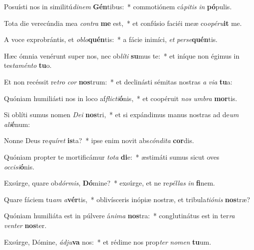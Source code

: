 \item Posuísti nos in similitú\textit{di}\textit{nem} \textbf{Gén}tibus:~* commotiónem cá\textit{pi}\textit{tis} \textit{in} \textbf{pó}pulis.
\item Tota die verecúndia mea \textit{con}\textit{tra} \textbf{me} est,~* et confúsio faciéi meæ co\textit{o}\textit{pé}\textit{ru}\textbf{it} me.
\item A voce exprobrántis, et \textit{ob}\textit{lo}\textbf{quén}tis:~* a fácie inimíci, \textit{et} \textit{per}\textit{se}\textbf{quén}tis.
\item Hæc ómnia venérunt super nos, nec ob\textit{lí}\textit{ti} \textbf{su}mus te:~* et iníque non égimus in tes\textit{ta}\textit{mén}\textit{to} \textbf{tu}o.
\item Et non recéssit re\textit{tro} \textit{cor} \textbf{nos}trum:~* et declinásti sémitas nostras \textit{a} \textit{vi}\textit{a} \textbf{tu}a:
\item Quóniam humiliásti nos in loco af\textit{flic}\textit{ti}\textbf{ó}nis,~* et coopéruit \textit{nos} \textit{um}\textit{bra} \textbf{mor}tis.
\item Si oblíti sumus nomen \textit{De}\textit{i} \textbf{nos}tri,~* et si expándimus manus nostras ad de\textit{um} \textit{a}\textit{li}\textbf{é}num:
\item Nonne Deus re\textit{quí}\textit{ret} \textbf{is}ta?~* ipse enim novit abs\textit{cón}\textit{di}\textit{ta} \textbf{cor}dis.
\item Quóniam propter te mortificámur \textit{to}\textit{ta} \textbf{di}e:~* æstimáti sumus sicut oves \textit{oc}\textit{ci}\textit{si}\textbf{ó}nis.
\item Exsúrge, quare ob\textit{dór}\textit{mis}, \textbf{Dó}mine?~* exsúrge, et ne re\textit{pél}\textit{las} \textit{in} \textbf{fi}nem.
\item Quare fáciem tu\textit{am} \textit{a}\textbf{vér}tis,~* oblivísceris inópiæ nostræ, et tribula\textit{ti}\textit{ó}\textit{nis} \textbf{nos}træ?
\item Quóniam humiliáta est in púlvere á\textit{ni}\textit{ma} \textbf{nos}tra:~* conglutinátus est in ter\textit{ra} \textit{ven}\textit{ter} \textbf{nos}ter.
\item Exsúrge, Dómine, \textit{ád}\textit{ju}\textbf{va} nos:~* et rédime nos prop\textit{ter} \textit{no}\textit{men} \textbf{tu}um.
